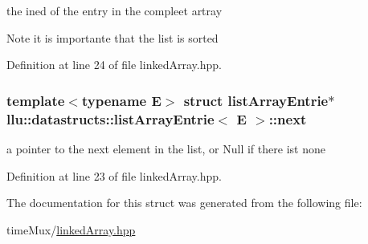 the ined of the entry in the compleet artray 

\begin{DoxyNote}{Note}
it is importante that the list is sorted 
\end{DoxyNote}


Definition at line 24 of file linked\+Array.\+hpp.

\hypertarget{structllu_1_1datastructs_1_1list_array_entrie_a110bf134b27bdfaa3ca518b40042591e}{
\subsubsection[{next}]{\setlength{\rightskip}{0pt plus 5cm}template$<$typename E$>$ struct {\bf list\+Array\+Entrie}$\ast$ {\bf llu\+::datastructs\+::list\+Array\+Entrie}$<$ E $>$\+::next}}\label{structllu_1_1datastructs_1_1list_array_entrie_a110bf134b27bdfaa3ca518b40042591e}


a pointer to the next element in the list, or Null if there ist none 



Definition at line 23 of file linked\+Array.\+hpp.



The documentation for this struct was generated from the following file\+:\begin{DoxyCompactItemize}
\item 
time\+Mux/\hyperlink{linked_array_8hpp}{linked\+Array.\+hpp}\end{DoxyCompactItemize}

